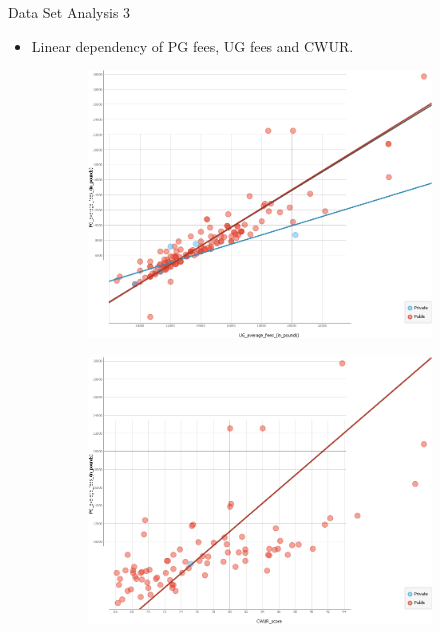 \documentclass{beamer} %
\begin{document}
\begin{frame}{Data Set Analysis 3}
  \vspace{-1cm}
  \begin{itemize}
    \item Linear dependency of PG fees, UG fees and CWUR.
  \end{itemize}
  \begin{figure}
      \centering
      
      \begin{subfigure}[b]{0.48\textwidth}
          \centering
          \includegraphics[width=\textwidth, trim={0 0 0 0}, clip]{./figs/scatter_UG_PG_fees_diff.png}
          \label{fig:sfig1}
      \end{subfigure}
      \hfill
      \begin{subfigure}[b]{0.48\textwidth}
          \centering
          \includegraphics[width=\textwidth, trim={0 0 0 0}, clip]{./figs/scatter_PG_fees_per_CWUR_score.png}
          \label{fig:sfig2}
      \end{subfigure}

      \label{fig:analysis_3}
    \end{figure}
\end{frame}
\end{document}
